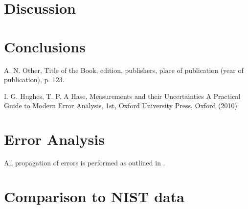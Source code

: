 \documentclass[10pt, twocolumn]{revtex4}    %
\begin{document}
\section{Discussion} \label{s:analysis}


\section{Conclusions} \label{s:conclusions}

\begin{thebibliography}{}

 A. N. Other, Title of the Book, edition, publishers, place of publication (year of publication), p. 123.   %

I. G. Hughes, T. P. A Hase, Measurements and their Uncertainties A Practical Guide to Modern Error Analysis, 1st, Oxford University Press, Oxford (2010)

\end{thebibliography} 

\clearpage
\appendix
\section{Error Analysis} \label{a:errors}
All propagation of errors is performed as outlined in \cite{errors}.

\clearpage
\section{Comparison to NIST data} \label{a:NIST}
\end{document}
